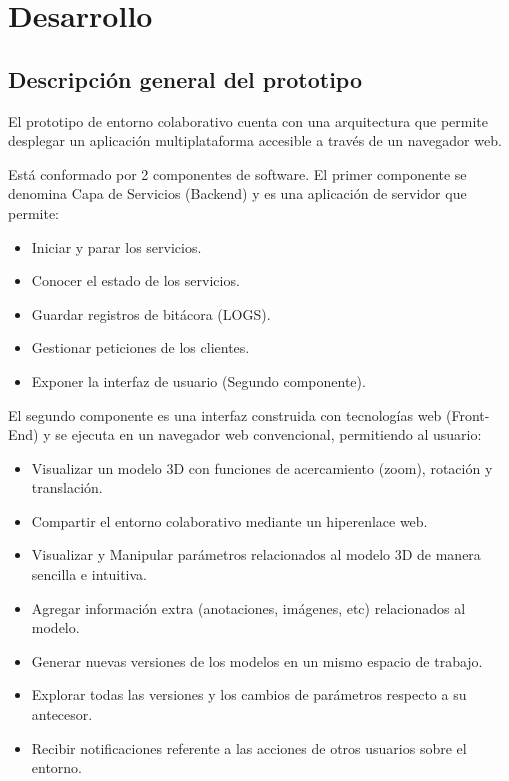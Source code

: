 \chapter{Desarrollo}
\label{chap: cap3}

\section{Descripción general del prototipo}
El prototipo de entorno colaborativo cuenta con una arquitectura que permite desplegar un aplicación multiplataforma accesible a través de un navegador web.

Está conformado por 2 componentes de software.
El primer componente se denomina Capa de Servicios (Backend) y es una aplicación de servidor que permite:
\begin{itemize}
  \item Iniciar y parar los servicios. 
  \item Conocer el estado de los servicios.
  \item Guardar registros de bitácora (LOGS).
  \item Gestionar peticiones de los clientes.
  \item Exponer la interfaz de usuario (Segundo componente).
\end{itemize}

El segundo componente es una interfaz construida con tecnologías web (Front-End) y se ejecuta en un navegador web convencional, permitiendo al usuario:
\begin{itemize}
  \item Visualizar un modelo 3D con funciones de acercamiento (zoom), rotación y translación.
  \item Compartir el entorno colaborativo mediante un hiperenlace web.
  \item Visualizar y Manipular parámetros relacionados al modelo 3D de manera sencilla e intuitiva.
  \item Agregar información extra (anotaciones, imágenes, etc) relacionados al modelo.
  \item Generar nuevas versiones de los modelos en un mismo espacio de trabajo.
  \item Explorar todas las versiones y los cambios de parámetros respecto a su antecesor.
  \item Recibir notificaciones referente a las acciones de otros usuarios sobre el entorno.
 
\end{itemize}



